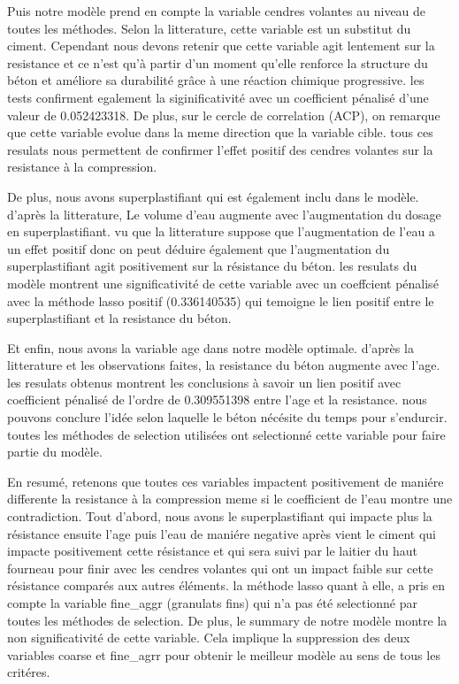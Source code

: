 \documentclass[
  12pt,
]{article}
\begin{document}
Puis notre modèle prend en compte la variable cendres volantes au niveau
de toutes les méthodes. Selon la litterature, cette variable est un
substitut du ciment. Cependant nous devons retenir que cette variable
agit lentement sur la resistance et ce n'est qu'à partir d'un moment
qu'elle renforce la structure du béton et améliore sa durabilité grâce à
une réaction chimique progressive. les tests confirment egalement la
siginificativité avec un coefficient pénalisé d'une valeur de
0.052423318. De plus, sur le cercle de correlation (ACP), on remarque
que cette variable evolue dans la meme direction que la variable cible.
tous ces resulats nous permettent de confirmer l'effet positif des
cendres volantes sur la resistance à la compression.

De plus, nous avons superplastifiant qui est également inclu dans le
modèle. d'après la litterature, Le volume d'eau augmente avec
l'augmentation du dosage en superplastifiant. vu que la litterature
suppose que l'augmentation de l'eau a un effet positif donc on peut
déduire également que l'augmentation du superplastifiant agit
positivement sur la résistance du béton. les resulats du modèle montrent
une significativité de cette variable avec un coeffcient pénalisé avec
la méthode lasso positif (0.336140535) qui temoigne le lien positif
entre le superplastifiant et la resistance du béton.

Et enfin, nous avons la variable age dans notre modèle optimale. d'après
la litterature et les observations faites, la resistance du béton
augmente avec l'age. les resulats obtenus montrent les conclusions à
savoir un lien positif avec coefficient pénalisé de l'ordre de
0.309551398 entre l'age et la resistance. nous pouvons conclure l'idée
selon laquelle le béton nécésite du temps pour s'endurcir. toutes les
méthodes de selection utilisées ont selectionné cette variable pour
faire partie du modèle.

En resumé, retenons que toutes ces variables impactent positivement de
maniére differente la resistance à la compression meme si le coefficient
de l'eau montre une contradiction. Tout d'abord, nous avons le
superplastifiant qui impacte plus la résistance ensuite l'age puis l'eau
de maniére negative après vient le ciment qui impacte positivement cette
résistance et qui sera suivi par le laitier du haut fourneau pour finir
avec les cendres volantes qui ont un impact faible sur cette résistance
comparés aux autres éléments. la méthode lasso quant à elle, a pris en
compte la variable fine\_aggr (granulats fins) qui n'a pas été
selectionné par toutes les méthodes de selection. De plus, le summary de
notre modèle montre la non significativité de cette variable. Cela
implique la suppression des deux variables coarse et fine\_agrr pour
obtenir le meilleur modèle au sens de tous les critéres.
\end{document}
